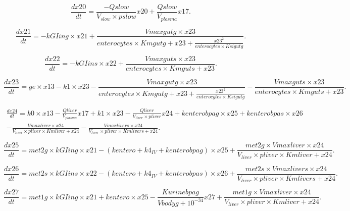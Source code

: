 \documentclass[a4paper,punct=banjiao,twoside]{ctexrep}
\theoremstyle{plain}
\theoremstyle{definition}
\theoremstyle{remark}
\begin{document}
\begin{equation}\label{eq20}
  \frac{dx20}{dt}=\frac{-Qslow}{V_{slow}  \times  pslow} x20+\frac{Qslow}{V_{plasma}}  x17.
\end{equation}

\begin{equation}\label{eq21}
  \frac{dx21}{dt}=-kGIing \times  x21+\frac{Vmaxgutg \times  x23}{enterocytes \times  Kmgutg+x23+\frac{x23^2}{enterocytes \times  Ksigutg}}.
\end{equation}

\begin{equation}\label{eq22}
  \frac{dx22}{dt}=-kGIins \times  x22+\frac{Vmaxguts \times  x23}{enterocytes \times  Kmguts+x23}.
\end{equation}

\begin{equation}\label{eq23}
  \frac{dx23}{dt}=ge \times  x13-k1 \times  x23-\frac{Vmaxgutg \times  x23}{enterocytes \times  Kmgutg+x23+\frac{x23^2}{enterocytes \times  Ksigutg}}-\frac{Vmaxguts \times  x23}{enterocytes \times  Kmguts+x23}.
\end{equation}

\begin{multline}\label{eq24}
  \frac{dx24}{dt}=k0 \times  x13-\frac{Qliver}{V_{plasma} } x17+k1 \times  x23-\frac{Qliver}{V_{liver}  \times  pliver} x24+kenterobpag \times  x25+kenterobpas \times  x26\\
  -\frac{Vmaxliver \times  x24}{V_{liver}  \times  pliver \times  Kmliver+x24}-\frac{Vmaxlivers \times  x24}{V_{liver}  \times  pliver \times  Kmlivers+x24}.
\end{multline}

\begin{equation}\label{eq25}
  \frac{dx25}{dt}=met2g \times  kGIing \times  x21-(kentero+k4_{IV}+kenterobpag) \times  x25+\frac{met2g \times  Vmaxliver \times  x24}{V_{liver}  \times  pliver \times  Kmliver+x24}.
\end{equation}

\begin{equation}\label{eq26}
  \frac{dx26}{dt}=met2s \times  kGIins \times  x22-(kentero+k4_{IV}+kenterobpas) \times  x26+\frac{met2s \times  Vmaxlivers \times  x24}{V_{liver}  \times  pliver \times  Kmlivers+x24}.
\end{equation}

\begin{equation}\label{eq27}
  \frac{dx27}{dt}=met1g \times  kGIing \times  x21+kentero \times  x25-\frac{Kurinebpag}{Vbodyg+10^{-34} } x27+\frac{met1g \times  Vmaxliver \times  x24}{V_{liver}  \times  pliver \times  Kmliver+x24}.
\end{equation}
\end{document}
